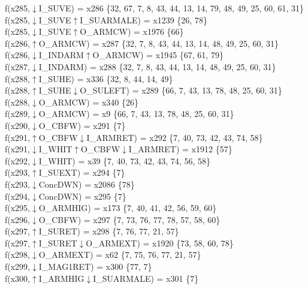 f(x285,$\downarrow$I\_SUVE) = x286 \{32, 67, 7, 8, 43, 44, 13, 14, 79, 48, 49, 25, 60, 61, 31\} \\  
f(x285,$\downarrow$I\_SUVE$\uparrow$I\_SUARMALE) = x1239 \{26, 78\} \\  
f(x285,$\downarrow$I\_SUVE$\uparrow$O\_ARMCW) = x1976 \{66\} \\  
f(x286,$\uparrow$O\_ARMCW) = x287 \{32, 7, 8, 43, 44, 13, 14, 48, 49, 25, 60, 31\} \\  
f(x286,$\downarrow$I\_INDARM$\uparrow$O\_ARMCW) = x1945 \{67, 61, 79\} \\  
f(x287,$\downarrow$I\_INDARM) = x288 \{32, 7, 8, 43, 44, 13, 14, 48, 49, 25, 60, 31\} \\  
f(x288,$\uparrow$I\_SUHE) = x336 \{32, 8, 44, 14, 49\} \\  
f(x288,$\uparrow$I\_SUHE$\downarrow$O\_SULEFT) = x289 \{66, 7, 43, 13, 78, 48, 25, 60, 31\} \\  
f(x288,$\downarrow$O\_ARMCW) = x340 \{26\} \\  
f(x289,$\downarrow$O\_ARMCW) = x9 \{66, 7, 43, 13, 78, 48, 25, 60, 31\} \\  
f(x290,$\downarrow$O\_CBFW) = x291 \{7\} \\  
f(x291,$\uparrow$O\_CBFW$\downarrow$I\_ARMRET) = x292 \{7, 40, 73, 42, 43, 74, 58\} \\  
f(x291,$\downarrow$I\_WHIT$\uparrow$O\_CBFW$\downarrow$I\_ARMRET) = x1912 \{57\} \\  
f(x292,$\downarrow$I\_WHIT) = x39 \{7, 40, 73, 42, 43, 74, 56, 58\} \\  
f(x293,$\uparrow$I\_SUEXT) = x294 \{7\} \\  
f(x293,$\downarrow$ConcDWN) = x2086 \{78\} \\  
f(x294,$\downarrow$ConcDWN) = x295 \{7\} \\  
f(x295,$\downarrow$O\_ARMHIG) = x173 \{7, 40, 41, 42, 56, 59, 60\} \\  
f(x296,$\downarrow$O\_CBFW) = x297 \{7, 73, 76, 77, 78, 57, 58, 60\} \\  
f(x297,$\uparrow$I\_SURET) = x298 \{7, 76, 77, 21, 57\} \\  
f(x297,$\uparrow$I\_SURET$\downarrow$O\_ARMEXT) = x1920 \{73, 58, 60, 78\} \\  
f(x298,$\downarrow$O\_ARMEXT) = x62 \{7, 75, 76, 77, 21, 57\} \\  
f(x299,$\downarrow$I\_MAG1RET) = x300 \{77, 7\} \\  
f(x300,$\uparrow$I\_ARMHIG$\downarrow$I\_SUARMALE) = x301 \{7\} \\  
